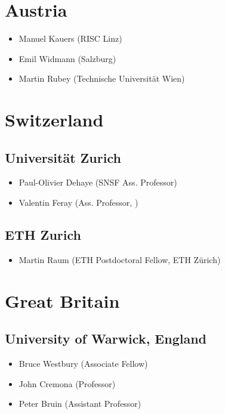 \section*{Austria}

\begin{itemize}
\item Manuel Kauers (RISC Linz)
\item Emil Widmann (Salzburg)
\item Martin Rubey (Technische Universität Wien)
\end{itemize}

\section*{Switzerland}
\subsection*{Universität Zurich}
\begin{itemize}
\item Paul-Olivier Dehaye (SNSF Ass. Professor)
\item Valentin Feray (Ass. Professor, \MATH)
\end{itemize}
\subsection*{ETH Zurich}
\begin{itemize}
\item Martin Raum (ETH Postdoctoral Fellow, ETH Zürich)
\end{itemize}

\section*{Great Britain}
\subsection*{University of Warwick, England}
\begin{itemize}
\item Bruce Westbury (Associate Fellow)
\item John Cremona (Professor)
\item Peter Bruin (Assistant Professor)
\end{itemize}

